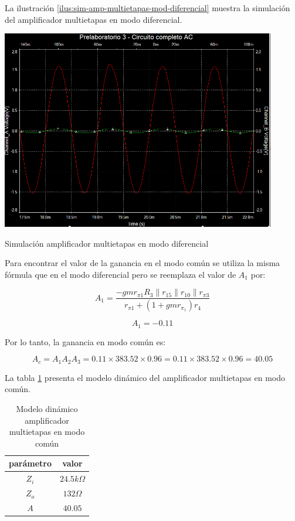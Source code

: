 La ilustración \ref{ilus:sim-amp-multietapas-mod-diferencial} muestra la simulación del amplificador multietapas en modo diferencial.

\begin{ilustracion}[ht]
    \centering
    \includegraphics[width=0.9\textwidth]{src/images/p3/multietapa-modo-diff-ganancia.png}
    \caption{Simulación amplificador multietapas en modo diferencial}
    \label{ilus:sim-amp-multietapas-mod-diferencial} 
\end{ilustracion}

Para encontrar el valor de la ganancia en el modo común se utiliza la misma fórmula que en el modo diferencial pero se reemplaza el valor de $A_1$ por:

$$ A_1 = \frac{-gmr_{\pi1} R_3 \parallel r_{15} \parallel r_{10} \parallel r_{\pi3}}{r_{\pi1} + (1+ gmr_{\pi_1})r_4}$$

$$ A_1 = -0.11 $$

Por lo tanto, la ganancia en modo común es:

$$ A_c = A_1 A_2 A_3 = 0.11 \times 383.52 \times 0.96 = 0.11 \times 383.52 \times 0.96 = 40.05 $$

La tabla \ref{tab:met-amp-multietapas-mod-comun} presenta el modelo dinámico del amplificador multietapas en modo común.

\begin{table}[ht]
    \centering
    \begin{tabular}{|c|c|}
        \hline
        parámetro & valor  \\
        \hline
        $Z_i$ & $24.5k\Omega$ \\
        \hline
        $Z_o$ & $132\Omega$ \\
        \hline
        $A$ & $40.05$ \\
        \hline
    \end{tabular}
    \caption{Modelo dinámico amplificador multietapas en modo común}
    \label{tab:met-amp-multietapas-mod-comun}
\end{table}

